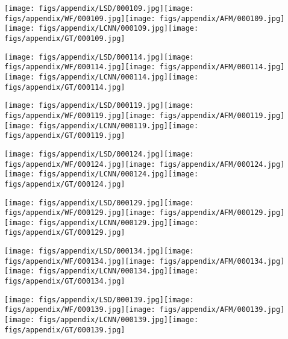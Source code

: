 \documentclass[10pt,twocolumn,letterpaper]{article}
\begin{document}
\texttt{[image: figs/appendix/LSD/000109.jpg]}\texttt{[image: figs/appendix/WF/000109.jpg]}\texttt{[image: figs/appendix/AFM/000109.jpg]}\texttt{[image: figs/appendix/LCNN/000109.jpg]}\texttt{[image: figs/appendix/GT/000109.jpg]}

\texttt{[image: figs/appendix/LSD/000114.jpg]}\texttt{[image: figs/appendix/WF/000114.jpg]}\texttt{[image: figs/appendix/AFM/000114.jpg]}\texttt{[image: figs/appendix/LCNN/000114.jpg]}\texttt{[image: figs/appendix/GT/000114.jpg]}

\texttt{[image: figs/appendix/LSD/000119.jpg]}\texttt{[image: figs/appendix/WF/000119.jpg]}\texttt{[image: figs/appendix/AFM/000119.jpg]}\texttt{[image: figs/appendix/LCNN/000119.jpg]}\texttt{[image: figs/appendix/GT/000119.jpg]}


\texttt{[image: figs/appendix/LSD/000124.jpg]}\texttt{[image: figs/appendix/WF/000124.jpg]}\texttt{[image: figs/appendix/AFM/000124.jpg]}\texttt{[image: figs/appendix/LCNN/000124.jpg]}\texttt{[image: figs/appendix/GT/000124.jpg]}

\texttt{[image: figs/appendix/LSD/000129.jpg]}\texttt{[image: figs/appendix/WF/000129.jpg]}\texttt{[image: figs/appendix/AFM/000129.jpg]}\texttt{[image: figs/appendix/LCNN/000129.jpg]}\texttt{[image: figs/appendix/GT/000129.jpg]}

\texttt{[image: figs/appendix/LSD/000134.jpg]}\texttt{[image: figs/appendix/WF/000134.jpg]}\texttt{[image: figs/appendix/AFM/000134.jpg]}\texttt{[image: figs/appendix/LCNN/000134.jpg]}\texttt{[image: figs/appendix/GT/000134.jpg]}

\texttt{[image: figs/appendix/LSD/000139.jpg]}\texttt{[image: figs/appendix/WF/000139.jpg]}\texttt{[image: figs/appendix/AFM/000139.jpg]}\texttt{[image: figs/appendix/LCNN/000139.jpg]}\texttt{[image: figs/appendix/GT/000139.jpg]}
\end{document}
